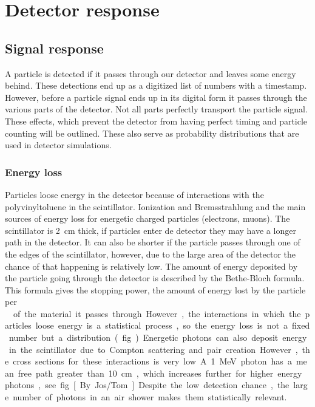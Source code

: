 \chapter{Detector response}

\section{Signal response}

A particle is detected if it passes through our detector and leaves some
energy behind. These detections end up as a digitized list of numbers
with a timestamp. However, before a particle signal ends up in its
digital form it passes through the various parts of the detector. Not
all parts perfectly transport the particle signal. These effects, which
prevent the detector from having perfect timing and particle counting
will be outlined. These also serve as probability distributions that are
used in detector simulations.


\subsection{Energy loss}

Particles loose energy in the detector because of interactions with the
polyvinyltoluene in the scintillator. Ionization and Bremsstrahlung and
the main sources of energy loss for energetic charged particles
(electrons, muons). The scintillator is \SI{2}{\centi\meter} thick, if
particles enter de detector they may have a longer path in the detector.
It can also be shorter if the particle passes through one of the edges
of the scintillator, however, due to the large area of the detector the
chance of that happening is relatively low. The amount of energy
deposited by the particle going through the detector is described by the
Bethe-Bloch formula. This formula gives the stopping power, the amount
of energy lost by the particle per \SI{}{\gram\centi\meter\square} of
the material it passes through. However, the interactions in which the
particles loose energy is a statistical process, so the energy loss is
not a fixed number but a distribution. (fig...)

Energetic photons can also deposit energy in the scintillator due to
Compton scattering and pair creation. However, the cross sections for
these interactions is very low. A \SI{1}{\mega\electronvolt} photon  has
a mean free path greater than \SI{10}{\centi\meter}, which increases
further for higher energy photons, see fig [By Jos/Tom]. Despite the low
detection chance, the large number of photons in an air shower makes
them statistically relevant.

